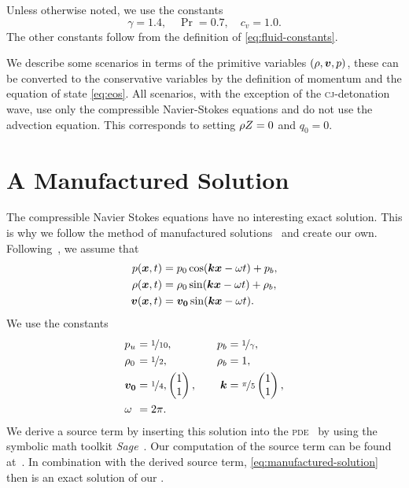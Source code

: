 Unless otherwise noted, we use the constants
\begin{equation}
  \gamma = 1.4, \quad \Pr = 0.7, \quad c_v = 1.0.
\end{equation}
The other constants follow from the definition of \cref{eq:fluid-constants}.

We describe some scenarios in terms of the primitive variables $(\rho, \bm{v}, p)$, these can be converted to the conservative variables by the definition of momentum and the equation of state \cref{eq:eos}.
All scenarios, with the exception of the \textsc{cj}-detonation wave, use only the compressible Navier-Stokes equations and do not use the advection equation.
This corresponds to setting $\rho Z = 0$ and $q_0 = 0$.

\section{A Manufactured Solution}\label{sec:manufactured-solution}
The compressible Navier Stokes equations have no interesting exact solution.
This is why we follow the method of manufactured solutions~\cite{salari2000code} and create our own.
Following~\cite{dumbser2010arbitrary}, we assume that
\begin{align}\label{eq:manufactured-solution}
\begin{split}
  p(\bm{x}, t) &= p_0 \cos( \bm{k} \bm{x} - \omega t ) + p_b, \\
  \rho(\bm{x}, t) &= \rho_0 \sin (\bm{k} \bm{x} - \omega t) + \rho_b, \\
  \bm{v}(\bm{x}, t) &= \bm{v_0} \sin(\bm{k} \bm{x} - \omega t).
\end{split}
\end{align}
We use the constants
\begin{equation}
\begin{alignedat}{6}
  & p_u &&= \nicefrac{1}{10}, \qquad& p_b &= \nicefrac{1}{\gamma}, \\
  & \rho_0 &&= \nicefrac{1}{2}, \qquad& \rho_b &= 1, \\
  & \bm{v_0} &&= \nicefrac{1}{4},
  \begin{pmatrix}
    1 \\
    1
  \end{pmatrix},
  \qquad& \bm{k} &= \nicefrac{\pi}{5}
  \begin{pmatrix}
    1\\
    1
  \end{pmatrix},\\
  & \omega &&= 2 \pi.
  \end{alignedat}
\end{equation}
We derive a source term by inserting this solution into the \textsc{pde}~ by using the symbolic math toolkit \textit{Sage}~\cite{sagemath}.
Our computation of the source term can be found at~\cite{krenz2018manufactured}.
In combination with the derived source term, \cref{eq:manufactured-solution} then is an exact solution of our \pde{}.

